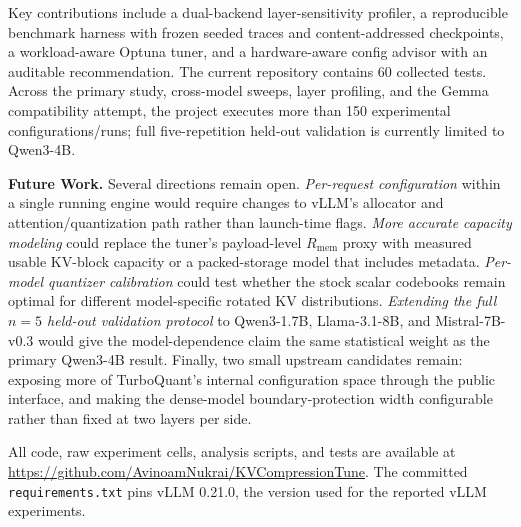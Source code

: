 \documentclass[10pt]{article}
\begin{document}
Key contributions include a dual-backend layer-sensitivity profiler, a reproducible benchmark harness with frozen seeded traces and content-addressed checkpoints, a workload-aware Optuna tuner, and a hardware-aware config advisor with an auditable recommendation. The current repository contains 60 collected tests. Across the primary study, cross-model sweeps, layer profiling, and the Gemma compatibility attempt, the project executes more than 150 experimental configurations/runs; full five-repetition held-out validation is currently limited to Qwen3-4B.

\textbf{Future Work.} Several directions remain open. \emph{Per-request configuration} within a single running engine would require changes to vLLM's allocator and attention/quantization path rather than launch-time flags. \emph{More accurate capacity modeling} could replace the tuner's payload-level $R_{\mathrm{mem}}$ proxy with measured usable KV-block capacity or a packed-storage model that includes metadata. \emph{Per-model quantizer calibration} could test whether the stock scalar codebooks remain optimal for different model-specific rotated KV distributions. \emph{Extending the full $n=5$ held-out validation protocol} to Qwen3-1.7B, Llama-3.1-8B, and Mistral-7B-v0.3 would give the model-dependence claim the same statistical weight as the primary Qwen3-4B result. Finally, two small upstream candidates remain: exposing more of TurboQuant's internal configuration space through the public interface, and making the dense-model boundary-protection width configurable rather than fixed at two layers per side.

All code, raw experiment cells, analysis scripts, and tests are available at \url{https://github.com/AvinoamNukrai/KVCompressionTune}. The committed \texttt{requirements.txt} pins vLLM 0.21.0, the version used for the reported vLLM experiments.
\end{document}
